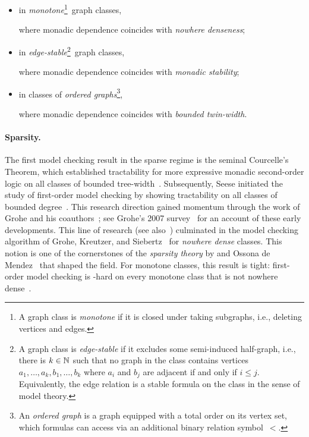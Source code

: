 \newcommand{\footnoteMonotone}{\footnote{A graph class is \emph{monotone} if it is closed under taking subgraphs, i.e., deleting vertices and edges.}}
\newcommand{\footnoteEdgeStable}{\footnote{\interlinepenalty=10000 %
A graph class is \emph{edge-stable} if it excludes some semi-induced half-graph, i.e., there is $k\in\N$ such that no graph in the class contains vertices $a_1,\ldots,a_k,b_1,\ldots,b_k$ where $a_i$ and $b_j$ are adjacent if and only if $i\le j$. Equivalently, the edge relation is a stable formula on the class in the sense of model theory.}}
\newcommand{\footnoteOrdered}{\footnote{An \emph{ordered graph} is a graph equipped with a total order on its vertex set, which formulas can access via an additional binary relation symbol~$<$.}}

\begin{itemize}
  \item in \emph{monotone}\footnoteMonotone~graph classes,
  \hfill \cite{gks}

  where monadic dependence coincides with \emph{nowhere denseness};\hfill \cite{AdlerA14,podewski1978stable}
  
  
  \item in \emph{edge-stable}\footnoteEdgeStable~graph classes,
  \hfill \cite{ms-mc1,ms-mc2}

  where monadic dependence coincides with \emph{monadic stability};
  \hfill \cite{rankwidth-meets-stability}
  
  
  \item in classes of \emph{ordered graphs}\footnoteOrdered,
  \hfill \cite{tww4,tww1}

  where monadic dependence coincides with \emph{bounded twin-width}.
  \hfill \cite{tww4}
\end{itemize}

\paragraph*{Sparsity.}
The first model checking result in the sparse regime is the seminal Courcelle's Theorem, which established tractability for more expressive monadic second-order logic on all classes of bounded tree-width~\cite{courcelle1990monadic}.
Subsequently, Seese initiated the study of first-order model checking by showing tractability on all classes of bounded degree~\cite{seese_1996}.
This research direction gained momentum through the work of Grohe and his coauthors~\cite{frick2001deciding,flum2001fixed,dawar2007locally}; see Grohe's 2007 survey~\cite{logic-graphs-algorithms} for an account of these early developments.
This line of research (see also~\cite{dawar2009domination,DvorakKT13-journal,GroheKreutzer2011}) culminated in the model checking algorithm of Grohe, Kreutzer, and Siebertz~\cite{gks} for \emph{nowhere dense} classes.
This notion is one of the cornerstones of the \emph{sparsity theory} by \Nesetril and Ossona de Mendez~\cite{NesetrilM11a,sparsity-book} that shaped the field.
For monotone classes, this result is tight: first-order model checking is \AWstar-hard on every monotone class that is not nowhere dense~\cite{DvorakKT13-journal,dawar2009parameterized}.

